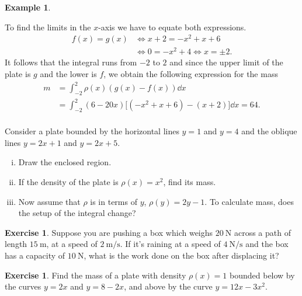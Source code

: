 \documentclass[12pt]{article}
\theoremstyle{plain}
\theoremstyle{definition}
\newtheorem{Ex}[Th]{Example}           %
\newtheorem{Ej}[Th]{Exercise}         %
\theoremstyle{remark}
\renewcommand{\:}{\colon}           %
\renewcommand{\.}{\Cdot}                %
\begin{document}
\begin{multicols}{2}
\begin{Ex}
\begin{center}
  
  
  \end{center}
  To find the limits in the $x$-axis we have to equate both expressions. 
  \begin{align*}
    f(x)=g(x)&\iff x+2=-x^2+x+6\\
    &\iff0=-x^2+4\iff x=\pm 2.
  \end{align*}
  It follows that the integral runs from $-2$ to $2$ and since the upper limit of the plate is $g$ and the lower is $f$, we obtain the following expression for the mass
  \begin{align*}
    m&=\int_{-2}^2\rho(x)(g(x)-f(x))\dd x\\
    &=\int_{-2}^2(6-20x)\lbrack(-x^2+x+6)-(x+2)\rbrack\dd x=64.\\
  \end{align*}
\end{Ex}

\begin{ptcbP}
  Consider a plate bounded by the horizontal lines $y=1$ and $y=4$ and the oblique lines $y=2x+1$ and $y=2x+5$.
  \vspace*{-0.5em}
  \begin{enumerate}[i)]
    \itemsep=-0.4em 
    \item Draw the enclosed region.
    \item If the density of the plate is $\rho(x)=x^2$, find its mass.
    \item Now assume that $\rho$ is in terms of $y$, $\rho(y)=2y-1$. To calculate mass, does the setup of the integral change?
  \end{enumerate}
\end{ptcbP}

\begin{Ej}
Suppose you are pushing a box which weighs $20\ \si\newton$ across a path of length $15\ \si\metre$, at a speed of $2\ \si{\metre\per\second}$. If it's raining at a speed of $4\ \si{\newton\per\second}$ and the box has a capacity of $10\ \si{\newton}$, what is the work done on the box after displacing it?
\end{Ej}

\begin{Ej}
  Find the mass of a plate with density $\rho(x)=1$ bounded below by the curves $y=2x$ and $y=8-2x$, and above by the curve $y=12x-3x^2$.
\end{Ej}
\end{multicols}
\end{document}
